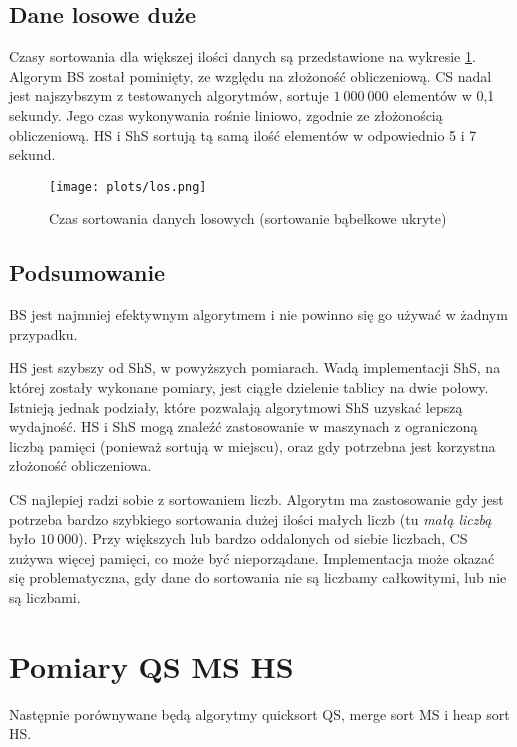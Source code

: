 \documentclass[11pt,twocolumn]{article}
\begin{document}
\subsection{Dane losowe duże}

Czasy sortowania dla większej ilości danych są przedstawione na wykresie \ref{losowe_duze}. Algorym BS został pominięty, ze względu na złożoność obliczeniową. CS nadal jest najszybszym z testowanych algorytmów, sortuje $1\ 000\ 000$ elementów w 0,1 sekundy. Jego czas wykonywania rośnie liniowo, zgodnie ze złożonością obliczeniową. HS i ShS sortują tą samą ilość elementów w odpowiednio 5 i 7 sekund.

\begin{figure}[h]
	\texttt{[image: plots/los.png]}
	\caption{Czas sortowania danych losowych (sortowanie bąbelkowe ukryte) \label{losowe_duze}}
\end{figure}



\subsection{Podsumowanie}

BS jest najmniej efektywnym algorytmem i nie powinno się go używać w żadnym przypadku. 

HS jest szybszy od ShS, w powyższych pomiarach. Wadą implementacji ShS, na której zostały wykonane pomiary, jest ciągłe dzielenie tablicy na dwie połowy. Istnieją jednak podziały, które pozwalają algorytmowi ShS uzyskać lepszą wydajność. HS i ShS mogą znaleźć zastosowanie w maszynach z ograniczoną liczbą pamięci (ponieważ sortują w miejscu), oraz gdy potrzebna jest korzystna złożoność obliczeniowa.

CS najlepiej radzi sobie z sortowaniem liczb. Algorytm ma zastosowanie gdy jest potrzeba bardzo szybkiego sortowania dużej ilości małych liczb (tu \emph{małą liczbą} było $10\ 000$). Przy większych lub bardzo oddalonych od siebie liczbach, CS zużywa więcej pamięci, co może być nieporządane. Implementacja może okazać się problematyczna, gdy dane do sortowania nie są liczbamy całkowitymi, lub nie są liczbami.



\section{Pomiary QS MS HS}

Następnie porównywane będą algorytmy quicksort QS, merge sort MS i heap sort HS.
\end{document}
